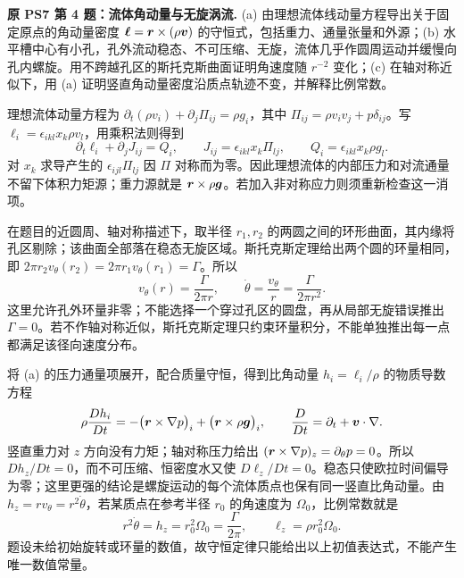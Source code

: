 \begin{example}
\textbf{原 PS7 第 4 题：流体角动量与无旋涡流.} 
(a) 由理想流体线动量方程导出关于固定原点的角动量密度 $\boldsymbol{\ell}=\boldsymbol{r}\times(\rho\boldsymbol{v})$ 的守恒式，包括重力、通量张量和外源；(b) 水平槽中心有小孔，孔外流动稳态、不可压缩、无旋，流体几乎作圆周运动并缓慢向孔内螺旋。用不跨越孔区的斯托克斯曲面证明角速度随 $r^{-2}$ 变化；(c) 在轴对称近似下，用 (a) 证明竖直角动量密度沿质点轨迹不变，并解释比例常数。
\end{example}
\begin{solution}
理想流体动量方程为 $\partial_t(\rho v_i)+\partial_j\Pi_{ij}=\rho g_i$，其中 $\Pi_{ij}=\rho v_iv_j+p\delta_{ij}$。写 $\ell_i=\epsilon_{ikl}x_k\rho v_l$，用乘积法则得到
\[
 \partial_t\ell_i+\partial_jJ_{ij}=Q_i,\qquad
 J_{ij}=\epsilon_{ikl}x_k\Pi_{lj},\qquad
 Q_i=\epsilon_{ikl}x_k\rho g_l.
\]
对 $x_k$ 求导产生的 $\epsilon_{ijl}\Pi_{lj}$ 因 $\Pi$ 对称而为零。因此理想流体的内部压力和对流通量不留下体积力矩源；重力源就是 $\boldsymbol{r}\times\rho\boldsymbol{g}$。若加入非对称应力则须重新检查这一消项。

在题目的近圆周、轴对称描述下，取半径 $r_1,r_2$ 的两圆之间的环形曲面，其内缘将孔区剔除；该曲面全部落在稳态无旋区域。斯托克斯定理给出两个圆的环量相同，即 $2\pi r_2v_\theta(r_2)=2\pi r_1v_\theta(r_1)=\Gamma$。所以
\[
 v_\theta(r)=\frac\Gamma{2\pi r},\qquad
 \dot\theta=\frac{v_\theta}{r}=\frac\Gamma{2\pi r^2}.
\]
这里允许孔外环量非零；不能选择一个穿过孔区的圆盘，再从局部无旋错误推出 $\Gamma=0$。若不作轴对称近似，斯托克斯定理只约束环量积分，不能单独推出每一点都满足该径向速度分布。

将 (a) 的压力通量项展开，配合质量守恒，得到比角动量 $h_i=\ell_i/\rho$ 的物质导数方程
\[
 \rho\frac{Dh_i}{Dt}
 =-\bigl(\boldsymbol{r}\times\nabla p\bigr)_i
 +\bigl(\boldsymbol{r}\times\rho\boldsymbol{g}\bigr)_i,
 \qquad \frac D{Dt}=\partial_t+\boldsymbol{v}\cdot\nabla.
\]
竖直重力对 $z$ 方向没有力矩；轴对称压力给出 $(\boldsymbol{r}\times\nabla p)_z=\partial_\theta p=0$。所以 $Dh_z/Dt=0$，而不可压缩、恒密度水又使 $D\ell_z/Dt=0$。稳态只使欧拉时间偏导为零；这里更强的结论是螺旋运动的每个流体质点也保有同一竖直比角动量。由 $h_z=rv_\theta=r^2\dot\theta$，若某质点在参考半径 $r_0$ 的角速度为 $\Omega_0$，比例常数就是
\[
 r^2\dot\theta=h_z=r_0^2\Omega_0=\frac\Gamma{2\pi},\qquad
 \ell_z=\rho r_0^2\Omega_0.
\]
题设未给初始旋转或环量的数值，故守恒定律只能给出以上初值表达式，不能产生唯一数值常量。
\end{solution}
